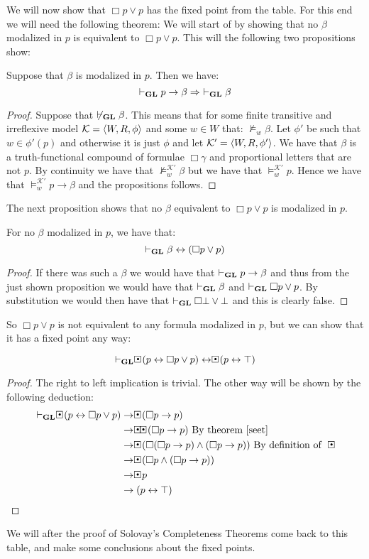\documentclass[../main.tex]{subfiles}
\begin{document}
We will now show that $\Box p\vee p$ has the fixed point from the table. For
this end we will need the following theorem:
We will start of by showing that no $\beta$ modalized in $p$ is equivalent to
$\Box p\vee p$. This will the following two propositions show:
\begin{prop}
	Suppose that $\beta$ is modalized in $p$. Then we have:
	\[\vdash_{\text{\textbf{GL}}} p\rightarrow\beta\Rightarrow\ \vdash_{\text{\textbf{GL}}}\beta\]
\end{prop}
\begin{proof}
	Suppose that $\not\vdash_{\text{\textbf{GL}}}\beta$. This means that for some finite
	transitive and irreflexive model $\mathcal{K}=\langle W,R,\phi\rangle$ and some $w\in W$ that:
	$\not\vDash_w\beta$. Let $\phi'$ be such that $w\in \phi'(p)$ and
	otherwise it is just $\phi$ and let $\mathcal{K}'=\langle W,R,\phi'\rangle$. We
	have that $\beta$ is a truth-functional compound of formulae
	$\Box\gamma$ and proportional letters that are not $p$. By continuity
	we have that $\not\vDash_w^{\mathcal{K}'}\beta$ but we have that
	$\vDash_w^{\mathcal{K}'}p$. Hence we have that
	$\vDash_w^{\mathcal{K}'}p\rightarrow\beta$ and the propositions follows.
\end{proof}
The next proposition shows that no $\beta$ equivalent to $\Box p\vee p$ is
modalized in $p$.
\begin{prop}
	For no $\beta$ modalized in $p$, we have that: 
	\[\vdash_{\text{\textbf{GL}}}\beta\leftrightarrow(\Box p\vee p)\]
\end{prop}
\begin{proof}
If there was such a $\beta$ we would have that $\vdash_{\text{\textbf{GL}}} p\rightarrow\beta$
and thus from the just shown proposition we would have that $\vdash_{\text{\textbf{GL}}}\beta$
and $\vdash_{\text{\textbf{GL}}}\Box p\vee p$. By substitution we would then have that
$\vdash_{\text{\textbf{GL}}}\Box\bot\vee\bot$ and this is clearly false.
\end{proof}
So $\Box p\vee p$ is not equivalent to any formula modalized in $p$, but we can
show that it has a fixed point any way:
\begin{prop}
	\[\vdash_\GL\sBox(p\leftrightarrow \Box p\vee
	p)\leftrightarrow\sBox(p\leftrightarrow\top)\]
\end{prop}
\begin{proof}
	The right to left implication is trivial. The other way will be shown
	by the following deduction:
	\begin{align*}
		\vdash_\GL\sBox(p\leftrightarrow\Box p\vee
		p)&\rightarrow\sBox(\Box p\rightarrow p)\\
		  &\rightarrow\sBox\sBox(\Box p\rightarrow p)\ \text{By
		  theorem \ref{seet}}\\
		  &\rightarrow\sBox (\Box(\Box p\rightarrow p)\wedge(\Box
		  p\rightarrow p))\ \text{By definition of}\ \sBox\\
		  &\rightarrow\sBox(\Box p\wedge(\Box p\rightarrow p))\\
		  &\rightarrow\sBox p\\
		  &\rightarrow (p\leftrightarrow \top)
	\end{align*}
\end{proof}
We will after the proof of Solovay's Completeness Theorems come back to this
table, and make some conclusions about the fixed points.
\end{document}
